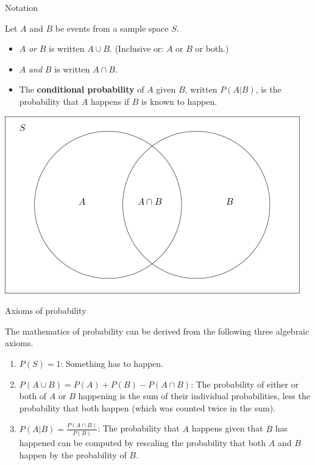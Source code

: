 \documentclass[
  ignorenonframetext,
]{beamer}
\providecommand{\tightlist}{%
  \setlength{\itemsep}{0pt}\setlength{\parskip}{0pt}}
\begin{document}
\begin{frame}{Notation}
\protect\hypertarget{notation}{}

Let \(A\) and \(B\) be events from a sample space \(S\).

\begin{itemize}
\tightlist
\item
  \(A\) \emph{or} \(B\) is written \(A\cup B\). (Inclusive or: \(A\) or
  \(B\) or both.)
\item
  \(A\) \emph{and} \(B\) is written \(A\cap B\).
\item
  The \textbf{conditional probability} of \(A\) given \(B\), written
  \(P(A|B)\), is the probability that \(A\) happens if \(B\) is known to
  happen.
\end{itemize}

\includegraphics[width=\textwidth,height=0.5\textheight]{../images/AB.png}

\end{frame}

\begin{frame}{Axioms of probability}
\protect\hypertarget{axioms-of-probability}{}

The mathematics of probability can be derived from the following three
algebraic axioms.

\begin{enumerate}
\item
  \(P(S)=1\): Something has to happen.
\item
  \(P(A\cup B)=P(A)+P(B)-P(A\cap B)\): The probability of either or both
  of \(A\) or \(B\) happening is the sum of their individual
  probabilities, less the probability that both happen (which was
  counted twice in the sum).
\item
  \(\displaystyle P(A|B)=\frac{P(A\cap B)}{P(B)}\): The probability that
  \(A\) happens given that \(B\) has happened can be computed by
  rescaling the probability that both \(A\) and \(B\) happen by the
  probability of \(B\).
\end{enumerate}

\end{frame}
\end{document}

